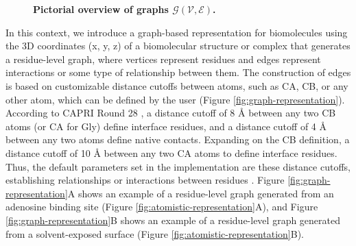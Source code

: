 \documentclass[Ingles]{phdthesis}
\begin{document}
\begin{figure}[h]
\begin{subfigure}{0.32\textwidth}
  \end{subfigure}
  \caption[Pictorial overview of graphs $\mathcal{G(V,E)}$]{\textbf{Pictorial overview of graphs $\mathcal{G(V,E)}$.}}
  \label{fig:graph-examples}
\end{figure}

In this context, we introduce a graph-based representation for biomolecules using the \acs{3D} coordinates (x, y, z) of a biomolecular structure or complex that generates a residue-level graph, where vertices represent residues and edges represent interactions or some type of relationship between them. The construction of edges is based on customizable distance cutoffs between atoms, such as \ac{CA}, \ac{CB}, or any other atom, which can be defined by the user (Figure \ref{fig:graph-representation}). According to \ac{CAPRI} Round 28 \cite{capri,round28}, a distance cutoff of 8 Å between any two \acs{CB} atoms (or \acs{CA} for Gly) define interface residues, and a distance cutoff of 4 Å between any two atoms define native contacts. Expanding on the \acs{CB} definition, a distance cutoff of 10 Å between any two \acs{CA} atoms to define interface residues. Thus, the default parameters set in the implementation are these distance cutoffs, establishing relationships or interactions between residues \cite{vishveshwara2002,mason2007}. Figure \ref{fig:graph-representation}A shows an example of a residue-level graph generated from an adenosine binding site (Figure \ref{fig:atomistic-representation}A), and Figure \ref{fig:graph-representation}B shows an example of a residue-level graph generated from a solvent-exposed surface (Figure \ref{fig:atomistic-representation}B).
\end{document}
